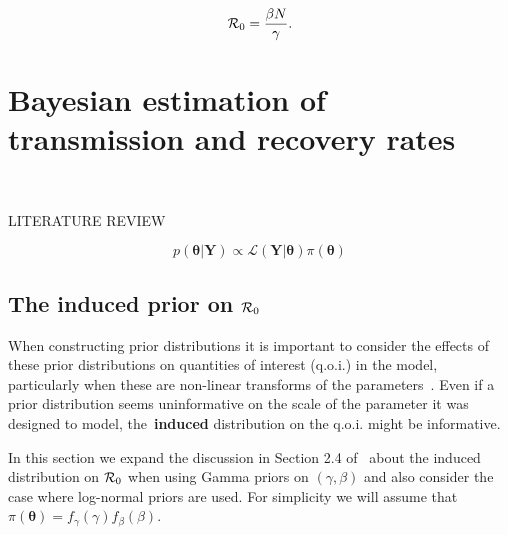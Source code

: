 \documentclass[alpha-refs]{wiley-article}
\newcommand{\rr}{ {\cal R}_0 }						%
\begin{document}
\begin{equation}
\label{eq:r0def}
\rr = \frac{\beta N}{\gamma}. 
\end{equation}

\section{Bayesian estimation of transmission and recovery rates}

~\citep{Coelho2011}



LITERATURE REVIEW

\begin{equation}
 \label{eq:posterior}
 p(\boldsymbol\theta | \boldsymbol Y) \propto \mathcal{L}(\boldsymbol Y | \boldsymbol \theta)\pi(\boldsymbol\theta)
\end{equation}


\subsection{The induced prior on $\rr$}

When constructing prior distributions it is important to consider the effects of these prior distributions on quantities of interest (q.o.i.) in the model, particularly when these are non-linear transforms of the parameters~\citep{Seaman2012}.
Even if a prior distribution seems uninformative on the scale of the parameter it was designed to model, the~\textbf{induced} distribution on the q.o.i. might be informative.

In this section we expand the discussion in Section 2.4 of~\cite{Clancy2008} about the induced distribution on $\rr$ when using Gamma priors on $(\gamma, \beta)$ and also consider the case where log-normal priors are used.
For simplicity we will assume that $\pi(\boldsymbol\theta) = f_{\gamma}(\gamma)f_{\beta}(\beta)$.
\end{document}

